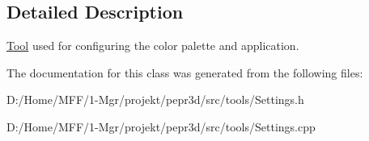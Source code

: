 \subsection{Detailed Description}
\mbox{\hyperlink{classpepr3d_1_1_tool}{Tool}} used for configuring the color palette and application. 

The documentation for this class was generated from the following files\+:\begin{DoxyCompactItemize}
\item 
D\+:/\+Home/\+M\+F\+F/1-\/\+Mgr/projekt/pepr3d/src/tools/Settings.\+h\item 
D\+:/\+Home/\+M\+F\+F/1-\/\+Mgr/projekt/pepr3d/src/tools/Settings.\+cpp\end{DoxyCompactItemize}
